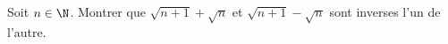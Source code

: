%
%
%
%
\begin{exr} 
Soit $n\in \N$. Montrer que $\sqrt{n+1}+\sqrt{n}$ et $\sqrt{n+1}-\sqrt{n}$ sont inverses l'un de l'autre.
\end{exr}
%
%
%
%
%
%
